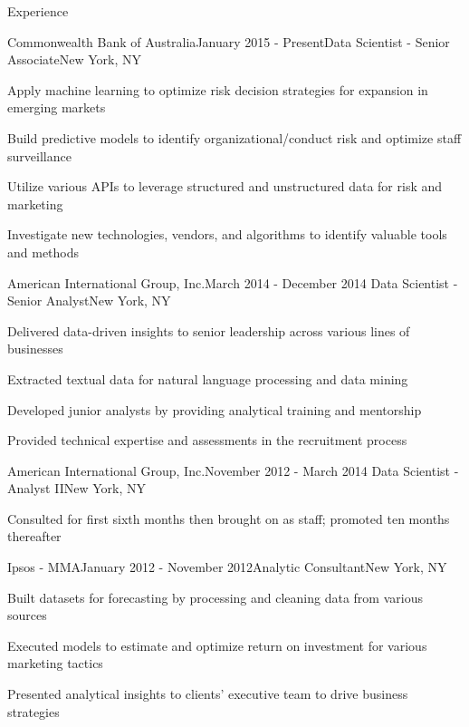 \documentclass{resume} %
\begin{document}
\vspace{-0.2cm}
\begin{rSection}{Experience}

\begin{rSubsection}{Commonwealth Bank of Australia}{January 2015 - Present}{Data Scientist - Senior Associate}{New York, NY}
\item Apply machine learning to optimize risk decision strategies for expansion in emerging markets
\item Build predictive models to identify organizational/conduct risk and optimize staff surveillance
\item Utilize various APIs to leverage structured and unstructured data for risk and marketing
\item Investigate new technologies, vendors, and algorithms to identify valuable tools and methods
\end{rSubsection}

\vspace{-0.2cm}
\begin{rSubsection}{American International Group, Inc.}{March 2014 - December 2014}
{Data Scientist - Senior Analyst}{New York, NY}
\item Delivered data-driven insights to senior leadership across various lines of businesses
\item Extracted textual data for natural language processing and data mining
\item Developed junior analysts by providing analytical training and mentorship
\item Provided technical expertise and assessments in the recruitment process
\end{rSubsection}

\vspace{-0.2cm}
\begin{rSubsection}{American International Group, Inc.}{November 2012 - March 2014}
{Data Scientist - Analyst II}{New York, NY}
\item Consulted for first sixth months then brought on as staff; promoted ten months thereafter
\end{rSubsection}

\vspace{-0.2cm}
\begin{rSubsection}{Ipsos - MMA}{January 2012 - November 2012}{Analytic Consultant}{New York, NY}
\item Built datasets for forecasting by processing and cleaning data from various sources
\item Executed models to estimate and optimize return on investment for various marketing tactics
\item Presented analytical insights to clients' executive team to drive business strategies
\end{rSubsection}



\end{rSection}
\end{document}
